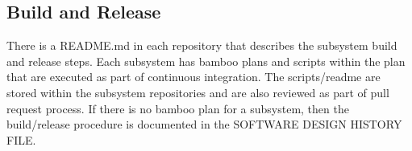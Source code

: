 \subsection{Build and Release}
There is a README.md in each repository that describes the subsystem \gls{build}
and release steps. Each subsystem has \gls{bamboo} plans and scripts within the
plan that are executed as part of continuous integration. The scripts/readme are
stored within the subsystem repositories and are also reviewed as part of pull
request process. If there is no \gls{bamboo} plan for a subsystem, then the
build/release procedure is documented in the SOFTWARE DESIGN HISTORY FILE. 
